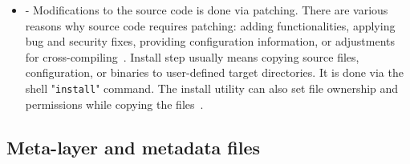 \begin{itemize}
\item {} - Modifications to the source code is done via patching. There are various reasons why source code requires patching: adding functionalities, applying bug and security fixes, providing configuration information, or adjustments for cross-compiling~\parencite{Reference1}. Install step usually means copying source files, configuration, or binaries to user-defined target directories. It is done via the shell "\texttt{install}" command. The install utility can also set file ownership and permissions while copying the files~\parencite{Reference1}.
\end{itemize}
\subsection{Meta-layer and metadata files}

